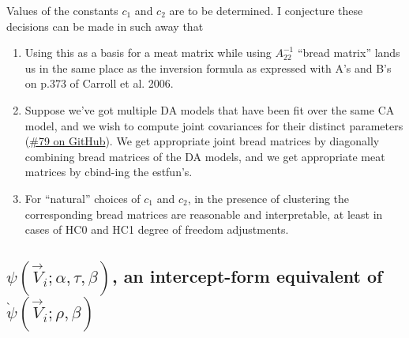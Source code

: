 \documentclass{article}
\begin{document}
Values of the constants $c_{1}$ and $c_{2}$ are to be determined.
I conjecture these decisions can be made in such away that 
\begin{enumerate}
\item Using this as a basis for a meat matrix while using
  $A_{22}^{-1}$  ``bread matrix'' lands us in the same place as the
  inversion formula as expressed with A's and B's on p.373 of Carroll
  et al. 2006.
\item Suppose we've got multiple DA models that have been fit over the
  same CA model, and we wish to compute joint covariances for their
  distinct parameters
  (\href{https://github.com/benbhansen-stats/propertee/issues/79}{\#79
    on GitHub}). We get appropriate joint bread matrices by
  diagonally combining bread matrices of the DA models, and we get
  appropriate meat matrices by cbind-ing the estfun's.
\item For ``natural'' choices of $c_{1}$ and $c_{2}$, in the
  presence of clustering the corresponding bread matrices are
  reasonable and interpretable, at least in cases of HC0 and HC1
  degree of freedom adjustments. 
\end{enumerate}

\subsection{$\psi(\vec{V}_{i};
  \alpha, \tau, \beta)$, an intercept-form equivalent of $\grave{\psi}(\vec{V}_{i};
  \rho, \beta)$}
\label{sec:psit-rho_0-tau}
\end{document}
